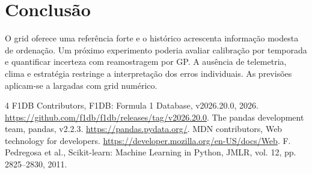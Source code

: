 \documentclass[conference,a4paper]{IEEEtran}
\begin{document}
\section{Conclusão}
O grid oferece uma referência forte e o histórico acrescenta informação modesta de ordenação. Um próximo experimento poderia avaliar calibração por temporada e quantificar incerteza com reamostragem por GP. A ausência de telemetria, clima e estratégia restringe a interpretação dos erros individuais. As previsões aplicam-se a largadas com grid numérico.
\begin{thebibliography}{4}
 F1DB Contributors, F1DB: Formula 1 Database, v2026.20.0, 2026. \url{https://github.com/f1db/f1db/releases/tag/v2026.20.0}.
 The pandas development team, pandas, v2.2.3. \url{https://pandas.pydata.org/}.
 MDN contributors, Web technology for developers. \url{https://developer.mozilla.org/en-US/docs/Web}.
 F. Pedregosa et al., Scikit-learn: Machine Learning in Python, JMLR, vol. 12, pp. 2825--2830, 2011.
\end{thebibliography}
\end{document}
